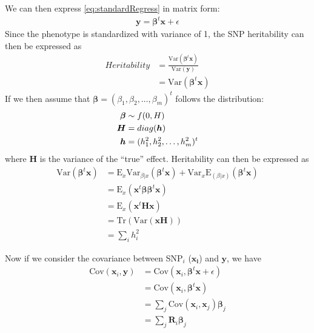 			We can then express \cref{eq:standardRegress} in matrix form:
			\begin{align}
				\boldsymbol{y}=\boldsymbol{\beta}^t\boldsymbol{x}+\epsilon
				\label{eq:matrixRegress}
			\end{align}
			Since the phenotype is standardized with variance of 1, the \gls{SNP} heritability can then be expressed as
			\begin{align}
				Heritability& = \frac{\mathrm{Var}(\boldsymbol{\beta}^t\boldsymbol{x})}{\mathrm{Var}(\boldsymbol{y})} \nonumber\\
				&=\mathrm{Var}(\boldsymbol{\beta}^t\boldsymbol{x})
			\end{align}
			If we then assume that $\boldsymbol{\beta} = (\beta_1, \beta_2,\dots,\beta_m)^t$ follows the distribution:
			\begin{align*}
				\boldsymbol{\beta}&\sim f(0,\boldmath{H})\\
				\boldsymbol{H}&=diag(\boldsymbol{h})\\
				\boldsymbol{h}&=(h_1^2,h_2^2,\dots,h_m^2)^t
			\end{align*}
			where $\boldsymbol{H}$ is the variance of the ``true'' effect. 
			Heritability can then be expressed as %
			\begin{align}
			\mathrm{Var}(\boldsymbol{\beta}^t\boldsymbol{x}) &= \mathrm{E}_x\mathrm{Var}_{\beta|x}(\boldsymbol{\beta}^t\boldsymbol{x})+\mathrm{Var}_x\mathrm{E}_{(\beta|x)}(\boldsymbol{\beta}^t\boldsymbol{x}) \nonumber\\
			&=\mathrm{E}_x(\boldsymbol{x}^t\boldsymbol{\beta\beta}^t\boldsymbol{x}) \nonumber\\ 
			&= \mathrm{E}_x(\boldsymbol{x}^t\boldsymbol{Hx}) \nonumber\\
			&=\mathrm{Tr}(\mathrm{Var}(\boldsymbol{x}\boldsymbol{H})) \nonumber\\
			&=\sum_ih_i^2
			\label{eq:proveHerit}
			\end{align}
			
			Now if we consider the covariance between \gls{SNP}$_i$ ($\boldsymbol{x_i}$) and $\boldsymbol{y}$, we have
			\begin{align}
			 \mathrm{Cov}(\boldsymbol{x}_i,\boldsymbol{y}) &= \mathrm{Cov}(\boldsymbol{x}_i,\boldsymbol{\beta}^t\boldsymbol{x}+\epsilon) \nonumber\\
			 &=\mathrm{Cov}(\boldsymbol{x}_i,\boldsymbol{\beta}^t\boldsymbol{x}) \nonumber\\
			 &=\sum_j{\mathrm{Cov}(\boldsymbol{x}_i,\boldsymbol{x}_j)\boldsymbol{\beta}_j} \nonumber\\
			 &=\sum_j{\boldsymbol{R}_i\boldsymbol{\beta}_j}
			 \label{eq:covPhenoTrue}
			\end{align}
			
